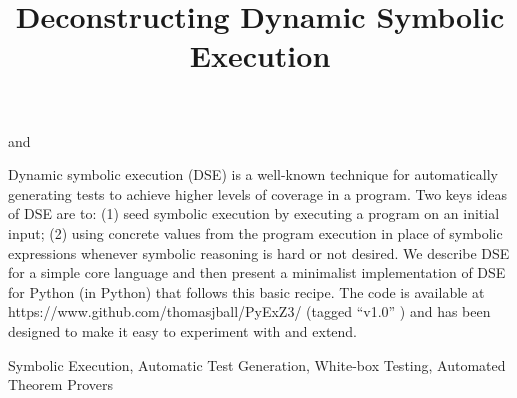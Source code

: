 \documentclass{IOS-Book-Article}
\begin{document}
\begin{frontmatter}              %
\title{Deconstructing Dynamic Symbolic Execution}
\author[A]{ }
and 
\author[B]{ }

\address[A]{Microsoft Research}
\address[B]{Charles University}\begin{mdDiv}[class={abstract},elem={abstract},data-line={39}]%
\begin{mdP}[data-line={40}]%
{}Dynamic symbolic execution (DSE) is a well-known technique
for automatically generating tests to achieve higher levels
of coverage in a program. Two keys ideas of DSE are
to: (1) seed symbolic execution by executing a program on an
initial input; (2) using concrete values from the program
execution in place of symbolic expressions whenever symbolic
reasoning is hard or not desired. We describe
DSE for a simple core language and then present
a minimalist implementation of DSE for Python (in Python) 
that follows this basic recipe. The code is available 
at https://www.github.com/thomasjball/PyExZ3/ (tagged %
{}{\textquotedblleft}v1.0{\textquotedblright}%
{}) 
and has been designed to make it easy to experiment with and
extend.%
\end{mdP}%
\end{mdDiv}%
\begin{keyword}
Symbolic Execution, Automatic Test Generation, White-box Testing, Automated 
Theorem Provers
\end{keyword}
\end{frontmatter}
\thispagestyle{empty}
\pagestyle{empty}%
\end{document}
